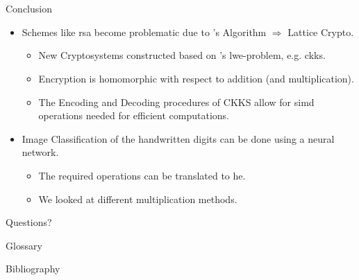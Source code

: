 \documentclass[aspectratio=169, onlytextwidth]{beamer}
\begin{document}
  

  \section*{}
  \begin{frame}{Conclusion}
    \begin{itemize}
      \item Schemes like \gls{rsa} become problematic due to 's Algorithm $\Rightarrow$ Lattice Crypto.
            \begin{itemize}
              \item New Cryptosystems constructed based on 's \gls{lwe}-problem, e.g. \gls{ckks}.
              \item Encryption is homomorphic with respect to addition (and multiplication).
              \item The Encoding and Decoding procedures of CKKS allow for \gls{simd} operations needed for efficient computations.
            \end{itemize}
      \item Image Classification of the handwritten digits can be done using a neural network.
            \begin{itemize}
              \item The required operations can be translated to \gls{he}.
              \item We looked at different multiplication methods.
            \end{itemize}
    \end{itemize}
  \end{frame}

  \begin{frame}[c]
    \centering
    \Large Questions?
  \end{frame}

  \begin{frame}[allowframebreaks]{Glossary}
    \printnoidxglossary[type=acronym]
  \end{frame}

  \begin{frame}[allowframebreaks]{Bibliography}
    \printbibliography
  \end{frame}

  
\end{document}
